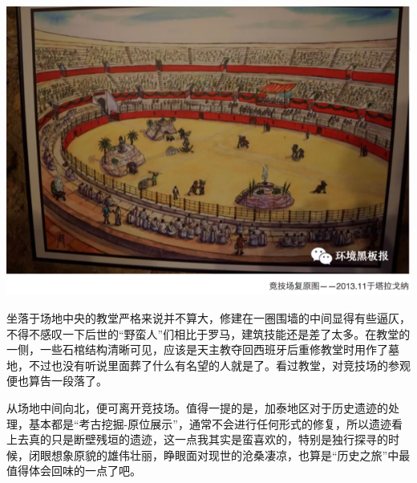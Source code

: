 \documentclass[]{book}
\begin{document}
\includegraphics[width=8.33in]{images/xt30}

坐落于场地中央的教堂严格来说并不算大，修建在一圈围墙的中间显得有些逼仄，不得不感叹一下后世的``野蛮人''们相比于罗马，建筑技能还是差了太多。在教堂的一侧，一些石棺结构清晰可见，应该是天主教夺回西班牙后重修教堂时用作了墓地，不过也没有听说里面葬了什么有名望的人就是了。看过教堂，对竞技场的参观便也算告一段落了。

从场地中间向北，便可离开竞技场。值得一提的是，加泰地区对于历史遗迹的处理，基本都是``考古挖掘-原位展示''，通常不会进行任何形式的修复，所以遗迹看上去真的只是断壁残垣的遗迹，这一点我其实是蛮喜欢的，特别是独行探寻的时候，闭眼想象原貌的雄伟壮丽，睁眼面对现世的沧桑凄凉，也算是``历史之旅''中最值得体会回味的一点了吧。
\end{document}
